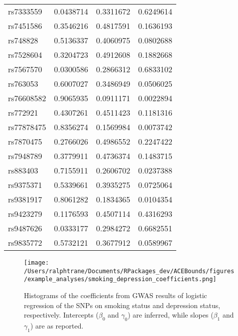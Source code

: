 \documentclass[
]{article}
\theoremstyle{plain}
\begin{document}
\begin{table}[H]
\begin{minipage}{0.5\linewidth}
\begin{table}[H]
\begin{tabular}{lrrr}
\addlinespace
rs7333559 & 0.0438714 & 0.3311672 & 0.6249614\\
rs7451586 & 0.3546216 & 0.4817591 & 0.1636193\\
rs748828 & 0.5136337 & 0.4060975 & 0.0802688\\
rs7528604 & 0.3204723 & 0.4912608 & 0.1882668\\
rs7567570 & 0.0300586 & 0.2866312 & 0.6833102\\
\addlinespace
rs763053 & 0.6007027 & 0.3486949 & 0.0506025\\
rs76608582 & 0.9065935 & 0.0911171 & 0.0022894\\
rs772921 & 0.4307261 & 0.4511423 & 0.1181316\\
rs77878475 & 0.8356274 & 0.1569984 & 0.0073742\\
rs7870475 & 0.2766026 & 0.4986552 & 0.2247422\\
\addlinespace
rs7948789 & 0.3779911 & 0.4736374 & 0.1483715\\
rs883403 & 0.7155911 & 0.2606702 & 0.0237388\\
rs9375371 & 0.5339661 & 0.3935275 & 0.0725064\\
rs9381917 & 0.8061282 & 0.1834365 & 0.0104354\\
rs9423279 & 0.1176593 & 0.4507114 & 0.4316293\\
\addlinespace
rs9487626 & 0.0333177 & 0.2984272 & 0.6682551\\
rs9835772 & 0.5732121 & 0.3677912 & 0.0589967\\
\bottomrule
\end{tabular}
\end{table}


  \end{minipage}
\end{table}

\begin{figure}[H]
  \center
  \texttt{[image: /Users/ralphtrane/Documents/RPackages\_dev/ACEBounds/figures/example\_analyses/smoking\_depression\_coefficients.png]}
  \caption{Histograms of the coefficients from GWAS results of logistic regression of the SNPs on smoking status and depression status, respectively. Intercepts ($\beta_0$ and $\gamma_0$) are inferred, while slopes ($\beta_1$ and $\gamma_1$) are as reported.}
  \label{fig:marginal-distribution-of-coefficients-depression}
\end{figure}
\end{document}
